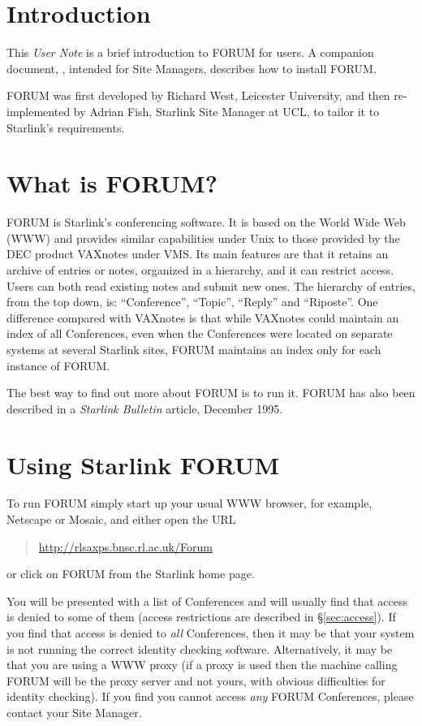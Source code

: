 \documentclass[twoside,11pt,nolof,noabs]{starlink}
\begin{document}
\scfrontmatter

\section{Introduction}

This \emph{User Note} is a brief introduction to FORUM for users.
A companion document, , intended for Site Managers, describes
how to install FORUM.

FORUM was first developed by Richard West, Leicester University, and
then re-implemented by Adrian Fish, Starlink Site Manager at UCL, to
tailor it to Starlink's requirements.

\section{What is FORUM?}

FORUM is Starlink's conferencing software.  It is based on the World
Wide Web (WWW) and provides similar capabilities under Unix to those
provided by the DEC product VAXnotes under VMS.  Its main features are
that it retains an archive of entries or notes, organized in a
hierarchy, and it can restrict access.  Users can both read existing
notes and submit new ones.    The hierarchy of entries, from the top
down, is:  ``Conference'', ``Topic'', ``Reply'' and ``Riposte''.  One
difference compared with VAXnotes is that while VAXnotes could maintain
an index of all Conferences, even when the Conferences were located on
separate systems at several Starlink sites, FORUM maintains an index
only for each instance of FORUM.

The best way to find out more about FORUM is to run it.  FORUM has also
been described in a \emph{Starlink Bulletin} article, December 1995.


\section{Using Starlink FORUM}

To run FORUM simply start up your
usual WWW browser, for example, Netscape or Mosaic, and either open the URL
\begin{quote}
\url{http://rlsaxps.bnsc.rl.ac.uk/Forum}
\end{quote}
or click on FORUM from the Starlink home page.

You will be presented with a list of Conferences and will usually find
that access is denied to some of them (access restrictions are described
in \S \ref{sec:access}).   If you find that access is denied to \emph{all} Conferences, then it may be that your system is not running the
correct identity checking software.   Alternatively, it may be that you
are using a WWW proxy (if a proxy is used then the machine calling
FORUM will be the proxy server and not yours, with obvious difficulties
for identity checking).  If you find you cannot access \emph{any} FORUM
Conferences, please contact your Site Manager.
\end{document}
